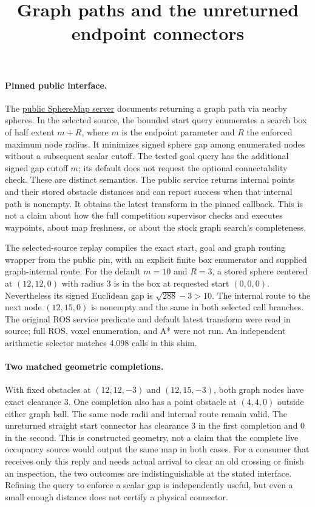 \documentclass[11pt]{article}
\title{Graph paths and the unreturned endpoint connectors}
\author{}\date{}
\begin{document}
\maketitle
\paragraph{Pinned public interface.}
The \href{https://github.com/ctu-mrs/spheremap/tree/da51db39172e4291c52ee8c509971eea579e13cc}
{public SphereMap server} documents returning a graph path via nearby spheres.
In the selected source, the bounded start query enumerates a search box
of half extent \(m+R\), where \(m\) is the endpoint parameter and \(R\)
the enforced maximum node radius. It minimizes signed sphere gap among
enumerated nodes without a subsequent scalar cutoff. The tested goal query
has the additional signed gap cutoff \(m\); its default does not request
the optional connectability check. These are distinct semantics.
The public service returns internal points and their stored obstacle
distances and can report success when that internal path is nonempty.
It obtains the latest transform in the pinned callback. This is not a
claim about how the full competition supervisor checks and executes
waypoints, about map freshness, or about the stock graph search's
completeness.

The selected-source replay compiles the exact start, goal and graph
routing wrapper from the public pin, with an explicit finite box
enumerator and supplied graph-internal route. For the default \(m=10\)
and \(R=3\), a stored sphere centered at \((12,12,0)\) with radius \(3\)
is in the box at requested start \((0,0,0)\). Nevertheless its signed
Euclidean gap is \(\sqrt{288}-3>10\). The internal route to the next node
\((12,15,0)\) is nonempty and the same in both selected call branches.
The original ROS service predicate and default latest transform were read
in source; full ROS, voxel enumeration, and A* were not run.
An independent arithmetic selector matches 4,098 calls in this shim.

\paragraph{Two matched geometric completions.}
With fixed obstacles at \((12,12,-3)\) and \((12,15,-3)\), both
graph nodes have exact clearance \(3\).
One completion also has a point obstacle at \((4,4,0)\) outside either
graph ball. The same node radii and internal route remain valid. The
unreturned straight start connector has clearance \(3\) in the first
completion and \(0\) in the second. This is constructed geometry, not
a claim that the complete live occupancy source would output the same
map in both cases. For a consumer that receives only this reply and
needs actual arrival to clear an old crossing or finish an inspection,
the two outcomes are indistinguishable at the stated interface.
Refining the query to enforce a scalar gap is independently useful,
but even a small enough distance does not certify a physical connector.
\end{document}
